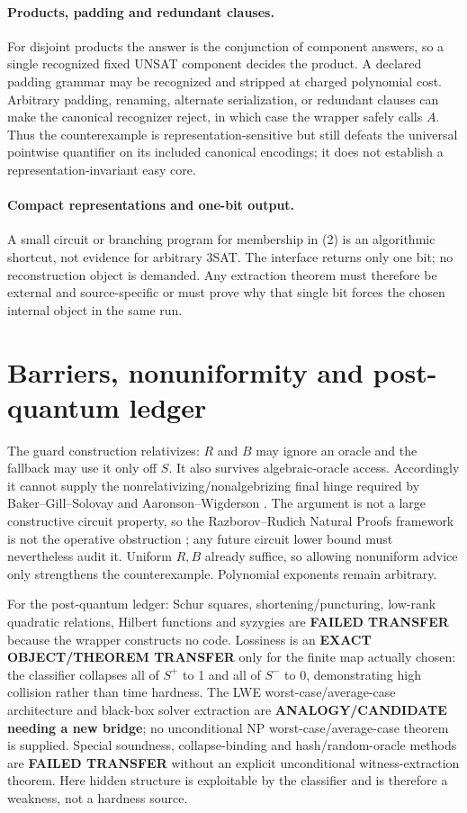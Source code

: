 \documentclass[11pt]{article}
\begin{document}
\paragraph{Products, padding and redundant clauses.}
For disjoint products the answer is the conjunction of component answers, so a
single recognized fixed UNSAT component decides the product.  A declared
padding grammar may be recognized and stripped at charged polynomial cost.
Arbitrary padding, renaming, alternate serialization, or redundant clauses can
make the canonical recognizer reject, in which case the wrapper safely calls
$A$.  Thus the counterexample is representation-sensitive but still defeats
the universal pointwise quantifier on its included canonical encodings; it does
not establish a representation-invariant easy core.

\paragraph{Compact representations and one-bit output.}
A small circuit or branching program for membership in (2) is an algorithmic
shortcut, not evidence for arbitrary 3SAT.  The interface returns only one bit;
no reconstruction object is demanded.  Any extraction theorem must therefore
be external and source-specific or must prove why that single bit forces the
chosen internal object in the same run.

\section{Barriers, nonuniformity and post-quantum ledger}

The guard construction relativizes: $R$ and $B$ may ignore an oracle and the
fallback may use it only off $S$.  It also survives algebraic-oracle access.
Accordingly it cannot supply the nonrelativizing/nonalgebrizing final hinge
required by Baker--Gill--Solovay and Aaronson--Wigderson
\cite{bgs,aw}.  The argument is not a large constructive circuit property, so
the Razborov--Rudich Natural Proofs framework is not the operative obstruction
\cite{rr}; any future circuit lower bound must nevertheless audit it.  Uniform
$R,B$ already suffice, so allowing nonuniform advice only strengthens the
counterexample.  Polynomial exponents remain arbitrary.

For the post-quantum ledger: Schur squares, shortening/puncturing, low-rank
quadratic relations, Hilbert functions and syzygies are \textbf{FAILED
TRANSFER} because the wrapper constructs no code.  Lossiness is an
\textbf{EXACT OBJECT/THEOREM TRANSFER} only for the finite map actually chosen:
the classifier collapses all of $S^+$ to 1 and all of $S^-$ to 0, demonstrating
high collision rather than time hardness.  The LWE worst-case/average-case
architecture and black-box solver extraction are
\textbf{ANALOGY/CANDIDATE needing a new bridge}; no unconditional NP
worst-case/average-case theorem is supplied.  Special soundness,
collapse-binding and hash/random-oracle methods are \textbf{FAILED TRANSFER}
without an explicit unconditional witness-extraction theorem.  Here hidden
structure is exploitable by the classifier and is therefore a weakness, not a
hardness source.
\end{document}
